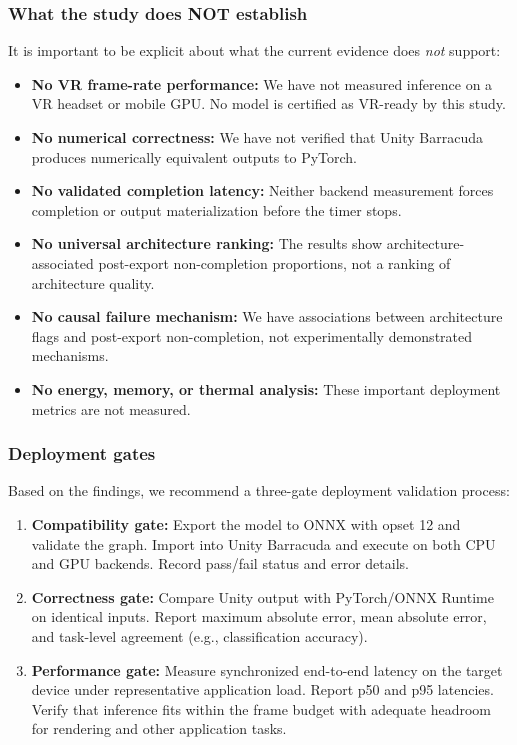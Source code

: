 \documentclass[10pt,twocolumn]{article}
\begin{document}
\subsubsection{What the study does NOT establish}

It is important to be explicit about what the current evidence does \emph{not} support:
\begin{itemize}[nosep,leftmargin=*]
  \item \textbf{No VR frame-rate performance:} We have not measured inference on a VR headset or mobile GPU. No model is certified as VR-ready by this study.
  \item \textbf{No numerical correctness:} We have not verified that Unity Barracuda produces numerically equivalent outputs to PyTorch.
  \item \textbf{No validated completion latency:} Neither backend measurement forces completion or output materialization before the timer stops.
  \item \textbf{No universal architecture ranking:} The results show architecture-associated post-export non-completion proportions, not a ranking of architecture quality.
  \item \textbf{No causal failure mechanism:} We have associations between architecture flags and post-export non-completion, not experimentally demonstrated mechanisms.
  \item \textbf{No energy, memory, or thermal analysis:} These important deployment metrics are not measured.
\end{itemize}

\subsubsection{Deployment gates}

Based on the findings, we recommend a three-gate deployment validation process:
\begin{enumerate}[nosep,leftmargin=*]
  \item \textbf{Compatibility gate:} Export the model to ONNX with opset 12 and validate the graph. Import into Unity Barracuda and execute on both CPU and GPU backends. Record pass/fail status and error details.
  \item \textbf{Correctness gate:} Compare Unity output with PyTorch/ONNX Runtime on identical inputs. Report maximum absolute error, mean absolute error, and task-level agreement (e.g., classification accuracy).
  \item \textbf{Performance gate:} Measure synchronized end-to-end latency on the target device under representative application load. Report p50 and p95 latencies. Verify that inference fits within the frame budget with adequate headroom for rendering and other application tasks.
\end{enumerate}
\end{document}
